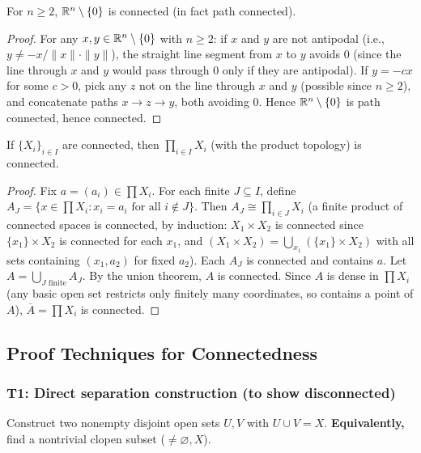 \documentclass{article}
\begin{document}
\begin{theorem}
  For $n \ge 2$, $\mathbb{R}^n \setminus \{0\}$ is connected (in fact path connected).
\end{theorem}
\begin{proof}
  For any $x, y \in \mathbb{R}^n \setminus \{0\}$ with $n \ge 2$:
  if $x$ and $y$ are not antipodal (i.e., $y \ne -x/\|x\| \cdot \|y\|$),
  the straight line segment from $x$ to $y$ avoids $0$ (since the line through
  $x$ and $y$ would pass through $0$ only if they are antipodal).
  If $y = -cx$ for some $c > 0$, pick any $z$ not on the line through
  $x$ and $y$
  (possible since $n \ge 2$), and concatenate paths $x \to z \to y$,
  both avoiding $0$. Hence $\mathbb{R}^n \setminus \{0\}$ is path connected,
  hence connected.
\end{proof}

\begin{theorem}
  If $\{X_i\}_{i \in I}$ are connected, then $\prod_{i \in I} X_i$
  (with the product topology) is connected.
\end{theorem}
\begin{proof}
  Fix $a = (a_i) \in \prod X_i$. For each finite $J \subseteq I$, define
  $A_J = \{x \in \prod X_i : x_i = a_i \text{ for all } i \notin J\}$.
  Then $A_J \cong \prod_{i \in J} X_i$ (a finite product of connected
    spaces is connected,
    by induction: $X_1 \times X_2$ is connected since $\{x_1\} \times
    X_2$ is connected for each $x_1$,
    and $(X_1 \times X_2) = \bigcup_{x_1} (\{x_1\} \times X_2)$ with
    all sets containing
  $(x_1, a_2)$ for fixed $a_2$).
  Each $A_J$ is connected and contains $a$. Let $A = \bigcup_{J
  \text{ finite}} A_J$.
  By the union theorem, $A$ is connected. Since $A$ is dense in $\prod X_i$
  (any basic open set restricts only finitely many coordinates, so
  contains a point of $A$),
  $\overline{A} = \prod X_i$ is connected.
\end{proof}

\subsection{Proof Techniques for Connectedness}

\subsubsection*{T1: Direct separation construction (to show disconnected)}
Construct two nonempty disjoint open sets $U, V$ with $U \cup V = X$.
\textbf{Equivalently,} find a nontrivial clopen subset ($\ne \varnothing, X$).
\end{document}
